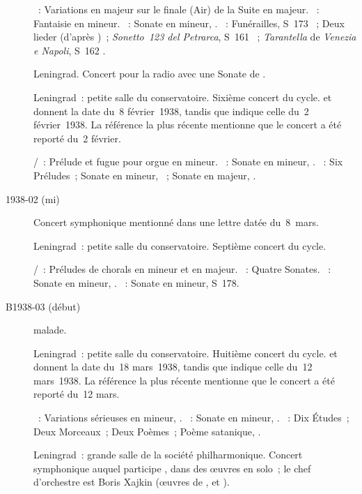 \begin{description}
 \textsc{\Haendel{}}~: Variations en \kE majeur sur le finale (Air) de la
 Suite  en \kE majeur.
 \textsc{\Mozart{}}~: Fantaisie en \kC mineur.
 \textsc{\Beethoven{}}~: Sonate en \kC mineur, .
 \textsc{\Liszt{}}~: Funérailles, S~173 ~; Deux lieder (d'après
 \Schubert{})~; \emph{Sonetto~123 del Petrarca}, S~161 ~;
 \emph{Tarantella} de \emph{Venezia e Napoli}, S~162 .
 \item[\DateWithWeekDay{1938-02-01}]
 Leningrad.
 Concert pour la radio avec une Sonate de \Haydn{}.
 \item[\DateWithWeekDay{1938-02-08}]
 Leningrad~: petite salle du conservatoire.
 Sixième concert du cycle.
 \citet[p.~158]{Nekrasova08} et \citet[p.~411]{Scriabine} donnent la date
 du~8 février~1938, tandis que \citet[p.~49]{White} indique celle du~2
 février~1938.
 La référence la plus récente mentionne que le concert a été reporté du~2
 février.

 \textsc{\Buxtehude{}/\Nikolaiev{}}~: Prélude et fugue pour orgue en \kF
 \Sharp mineur.
 \textsc{\Schumann{}}~: Sonate en \kF \Sharp mineur, .
 \textsc{\Scriabine{}}~: Six Préludes~; Sonate en \kF \Sharp mineur,
 ~; Sonate en \kF \Sharp majeur, .
 \item[1938-02 (mi)]
 Concert symphonique mentionné dans une lettre datée du~8~mars.
 \item[\DateWithWeekDay{1938-02-24}]
 Leningrad~: petite salle du conservatoire.
 Septième concert du cycle.

 \textsc{\JBach{}/\Busoni{}}~: Préludes de chorals en \kG mineur et en \kG
 majeur.
 \textsc{\Scarlatti{}}~: Quatre Sonates.
 \textsc{\Beethoven{}}~: Sonate en \kF mineur, .
 \textsc{\Liszt{}}~: Sonate en \kB mineur, S~178.
 \item[B1938-03 (début)]
 \VSofronitsky{} malade.
 \item[\DateWithWeekDay{1938-03-18}]
 Leningrad~: petite salle du conservatoire.
 Huitième concert du cycle.
 \citet[p.~158]{Nekrasova08} et \citet[p.~411]{Scriabine} donnent la date
 du~18 mars~1938, tandis que \citet[p.~49]{White} indique celle du~12
 mars~1938.
 La référence la plus récente mentionne que le concert a été reporté du~12
 mars.

 \textsc{\Mendelssohn{}}~: Variations sérieuses en \kD mineur, .
 \textsc{\Chopin{}}~: Sonate en \kB mineur, .
 \textsc{\Scriabine{}}~: Dix Études~; Deux Morceaux~; Deux Poèmes~; Poème
 satanique, .
 \item[\DateWithWeekDay{1938-03-24}]
 Leningrad~: grande salle de la société philharmonique.
 Concert symphonique auquel participe \VSofronitsky{}, dans des œuvres en
 solo~; le chef d'orchestre est Boris Xajkin (œuvres de \Borodine{},
 \Liadov{} et \Tchaikovski{}).


\end{description}
